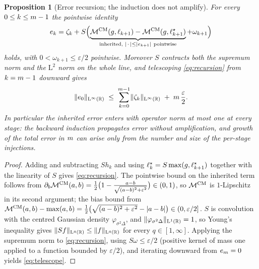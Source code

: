 \documentclass[11pt]{article}
\newcommand{\heatSemigroup}{S}       %
\newcommand{\stageDatum}{h}          %
\newcommand{\stageError}{e}          %
\newcommand{\solveError}{\zeta}      %
\newcommand{\smoothMaxBias}{\omega}  %
\theoremstyle{plain}
\newtheorem{proposition}[theorem]{Proposition}
\theoremstyle{definition}
\theoremstyle{remark}
\begin{document}
\begin{proposition}[Error recursion; the induction does not amplify]\label{prop:recursion}
For every $0\le k\le m-1$ the pointwise identity
\begin{equation}\label{eq:recursion}
  \stageError_k
  =\solveError_k
  +\heatSemigroup\Bigl(
     \underbrace{\smoothMaxCM(\payoff,\continuationValue_{k+1})
                -\smoothMaxCM(\payoff,\continuationValue^{\star}_{k+1})}_{
                \text{inherited, }\abs{\,\cdot\,}\le\abs{\stageError_{k+1}}\ \text{pointwise}}
     +\smoothMaxBias_{k+1}\Bigr)
\end{equation}
holds, with $0<\smoothMaxBias_{k+1}\le\varepsilon/2$ pointwise. Moreover
$\heatSemigroup$ contracts both the supremum norm and the $\mathrm{L}^{2}$ norm
\emph{on the whole line}, and telescoping \eqref{eq:recursion} from
$k=m-1$ downward gives
\begin{equation}\label{eq:telescope}
  \norm{\stageError_0}_{\mathrm{L}^{\infty}(\R)}
  \;\le\;\sum_{k=0}^{\numExerciseDates-1}
    \norm{\solveError_k}_{\mathrm{L}^{\infty}(\R)}
   \;+\;\numExerciseDates\,\frac{\varepsilon}{2}.
\end{equation}
In particular the inherited error enters with operator norm at most one at every
stage: the backward induction propagates error without amplification, and growth
of the total error in $m$ can arise only from the number and size
of the per-stage injections.
\end{proposition}
\begin{proof}
Adding and subtracting $\heatSemigroup\stageDatum_k$ and using
$\continuationValue^{\star}_k=\heatSemigroup\max(\payoff,\continuationValue^{\star}_{k+1})$
together with the linearity of $\heatSemigroup$ gives \eqref{eq:recursion}. The
pointwise bound on the inherited term follows from
$\partial_b\mathcal{M}^{\mathrm{CM}}(a,b)=\tfrac12\bigl(1-\tfrac{a-b}{\sqrt{(a-b)^{2}+\varepsilon^{2}}}\bigr)\in(0,1)$,
so $\mathcal{M}^{\mathrm{CM}}$ is $1$-Lipschitz in its second argument; the bias bound from
$\mathcal{M}^{\mathrm{CM}}(a,b)-\max(a,b)=\tfrac12\bigl(\sqrt{(a-b)^{2}+\varepsilon^{2}}-\lvert a-b\rvert\bigr)\in(0,\varepsilon/2]$.
$\heatSemigroup$ is convolution with the centred Gaussian density
$\varphi_{\sigma^{2}\Delta}$, and $\lVert\varphi_{\sigma^{2}\Delta}\rVert_{\mathrm{L}^{1}(\mathbb{R})}=1$,
so Young's inequality gives
$\norm{\heatSemigroup f}_{\mathrm{L}^{q}(\R)}\le\norm{f}_{\mathrm{L}^{q}(\R)}$ for
every $q\in[1,\infty]$.
Applying the supremum norm to \eqref{eq:recursion}, using
$\heatSemigroup\smoothMaxBias\le\varepsilon/2$ (positive kernel of mass one applied
to a function bounded by $\varepsilon/2$), and iterating downward from
$\stageError_{\numExerciseDates}=0$ yields \eqref{eq:telescope}.
\end{proof}
\end{document}
